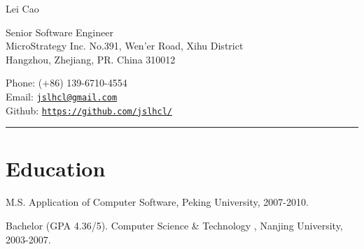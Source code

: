 \documentclass[letterpaper]{article}
\def\name{Lei Cao}
\renewenvironment{itemize}{
  \begin{list}{}{
    \setlength{\leftmargin}{1.5em}
    \setlength{\itemsep}{0pt}
  }
}{
  \end{list}
}
\begin{document}
{\huge \name}


\vspace{0.2in}
\begin{minipage}{0.55\linewidth}
  Senior Software Engineer \\
  MicroStrategy Inc.
  No.391, Wen'er Road, Xihu District\\
  Hangzhou, Zhejiang, PR. China 310012
\end{minipage}
\vspace{0.2in}
\begin{minipage}{0.40\linewidth}
  Phone: ($+$86) 139-6710-4554 \\
  Email: \href{mailto:jslhcl@gmail.com}{\tt jslhcl@gmail.com} \\
  Github: \href{https://github.com/jslhcl/}{\tt https://github.com/jslhcl/} 
\end{minipage}

\rule{16.8cm}{0.1em}


\vspace{-1.5em}
\section*{Education}
\begin{itemize}
  \item M.S. Application of Computer Software, Peking University, 2007-2010.
  \item Bachelor (GPA 4.36/5). Computer Science \& Technology , Nanjing University, 2003-2007.
\end{itemize}

\end{document}
